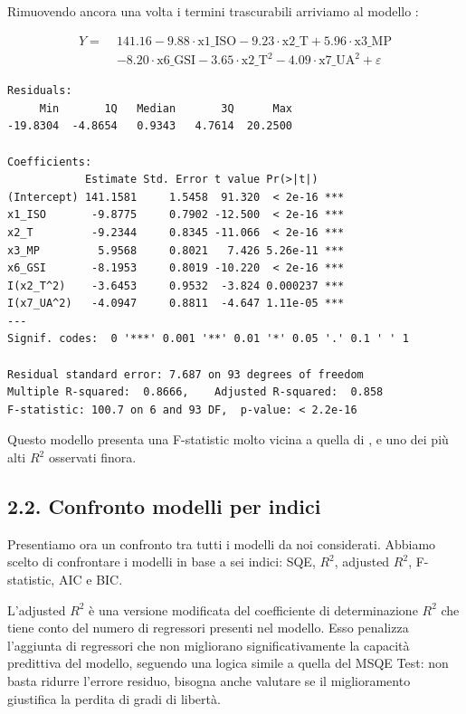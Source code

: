 Rimuovendo ancora una volta i termini trascurabili arriviamo al modello \texttt{}:

\[
\begin{aligned}
Y =\;& 141.16 - 9.88 \cdot \text{x1\_ISO}
       - 9.23 \cdot \text{x2\_T}
       + 5.96 \cdot \text{x3\_MP}\\
     & - 8.20 \cdot \text{x6\_GSI}
       - 3.65 \cdot \text{x2\_T}^2
       - 4.09 \cdot \text{x7\_UA}^2 + \varepsilon
\end{aligned}
\]

\begin{lstlisting}[style=rconsole,caption={fit0002}]
Residuals:
     Min       1Q   Median       3Q      Max
-19.8304  -4.8654   0.9343   4.7614  20.2500

Coefficients:
            Estimate Std. Error t value Pr(>|t|)
(Intercept) 141.1581     1.5458  91.320  < 2e-16 ***
x1_ISO       -9.8775     0.7902 -12.500  < 2e-16 ***
x2_T         -9.2344     0.8345 -11.066  < 2e-16 ***
x3_MP         5.9568     0.8021   7.426 5.26e-11 ***
x6_GSI       -8.1953     0.8019 -10.220  < 2e-16 ***
I(x2_T^2)    -3.6453     0.9532  -3.824 0.000237 ***
I(x7_UA^2)   -4.0947     0.8811  -4.647 1.11e-05 ***
---
Signif. codes:  0 '***' 0.001 '**' 0.01 '*' 0.05 '.' 0.1 ' ' 1

Residual standard error: 7.687 on 93 degrees of freedom
Multiple R-squared:  0.8666,    Adjusted R-squared:  0.858
F-statistic: 100.7 on 6 and 93 DF,  p-value: < 2.2e-16
\end{lstlisting}

Questo modello presenta una F-statistic molto vicina a quella di \texttt{}, e uno dei più alti $R^2$ osservati finora.

\subsection{2.2. Confronto modelli per indici}
\label{sec:22-confronto-modelli-per-indici}

Presentiamo ora un confronto tra tutti i modelli da noi considerati. Abbiamo scelto di confrontare i modelli in base a sei indici: SQE, $R^2$, adjusted $R^2$, F-statistic, AIC e BIC.

L'adjusted $R^2$ è una versione modificata del coefficiente di determinazione $R^2$ che tiene conto del numero di regressori presenti nel modello. Esso penalizza l'aggiunta di regressori che non migliorano significativamente la capacità predittiva del modello, seguendo una logica simile a quella del MSQE Test: non basta ridurre l'errore residuo, bisogna anche valutare se il miglioramento giustifica la perdita di gradi di libertà.

